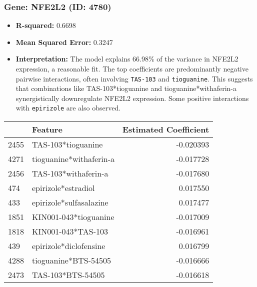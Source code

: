 \documentclass[12pt]{article}
\begin{document}
\subsubsection{Gene: NFE2L2 (ID: 4780)}
\begin{itemize}
    \item \textbf{R-squared:} 0.6698
    \item \textbf{Mean Squared Error:} 0.3247
    \item \textbf{Interpretation:} The model explains 66.98\% of the variance in NFE2L2 expression, a reasonable fit. The top coefficients are predominantly negative pairwise interactions, often involving \texttt{TAS-103} and \texttt{tioguanine}. This suggests that combinations like TAS-103*tioguanine and tioguanine*withaferin-a synergistically downregulate NFE2L2 expression. Some positive interactions with \texttt{epirizole} are also observed.
\end{itemize}
\begin{tabularx}{\textwidth}{l X r}
\toprule
{} & Feature & Estimated Coefficient \\
\midrule
2455 & TAS-103*tioguanine & -0.020393 \\
4271 & tioguanine*withaferin-a & -0.017728 \\
2456 & TAS-103*withaferin-a & -0.017680 \\
474 & epirizole*estradiol & 0.017550 \\
433 & epirizole*sulfasalazine & 0.017477 \\
1851 & KIN001-043*tioguanine & -0.017009 \\
1818 & KIN001-043*TAS-103 & -0.016961 \\
439 & epirizole*diclofensine & 0.016799 \\
4288 & tioguanine*BTS-54505 & -0.016666 \\
2473 & TAS-103*BTS-54505 & -0.016618 \\
\bottomrule
\end{tabularx}
\end{document}
